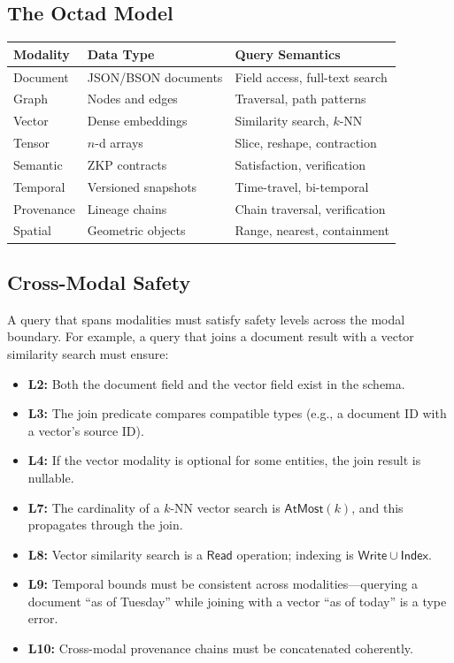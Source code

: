 \documentclass[11pt,a4paper]{article}
\begin{document}
\subsection{The Octad Model}

\begin{center}
\begin{tabular}{lll}
\toprule
\textbf{Modality} & \textbf{Data Type} & \textbf{Query Semantics} \\
\midrule
Document   & JSON/BSON documents & Field access, full-text search \\
Graph      & Nodes and edges     & Traversal, path patterns \\
Vector     & Dense embeddings    & Similarity search, $k$-NN \\
Tensor     & $n$-d arrays        & Slice, reshape, contraction \\
Semantic   & ZKP contracts       & Satisfaction, verification \\
Temporal   & Versioned snapshots & Time-travel, bi-temporal \\
Provenance & Lineage chains      & Chain traversal, verification \\
Spatial    & Geometric objects   & Range, nearest, containment \\
\bottomrule
\end{tabular}
\end{center}

\subsection{Cross-Modal Safety}

A query that spans modalities must satisfy safety levels across the
modal boundary.  For example, a query that joins a document result
with a vector similarity search must ensure:

\begin{itemize}[nosep]
  \item \textbf{L2:} Both the document field and the vector field
    exist in the schema.
  \item \textbf{L3:} The join predicate compares compatible types
    (e.g., a document ID with a vector's source ID).
  \item \textbf{L4:} If the vector modality is optional for some
    entities, the join result is nullable.
  \item \textbf{L7:} The cardinality of a $k$-NN vector search
    is $\mathsf{AtMost}(k)$, and this propagates through the join.
  \item \textbf{L8:} Vector similarity search is a $\mathsf{Read}$
    operation; indexing is $\mathsf{Write} \cup \mathsf{Index}$.
  \item \textbf{L9:} Temporal bounds must be consistent across
    modalities---querying a document ``as of Tuesday'' while joining
    with a vector ``as of today'' is a type error.
  \item \textbf{L10:} Cross-modal provenance chains must be
    concatenated coherently.
\end{itemize}
\end{document}
